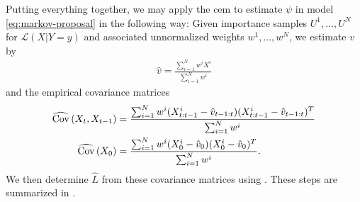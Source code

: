 Putting everything together, we may apply the \gls{cem} to estimate $\psi$ in model \eqref{eq:markov-proposal} in the following way: Given importance samples $U^{1}, \dots, U^{N}$ for $\mathcal L (X| Y = y)$ and associated unnormalized weights $w^{1}, \dots, w^{N}$, we estimate $v$ by 
\begin{align}
\label{eq:hat_v}
\hat v = \frac{\sum_{i = 1}^N w^{i}X^{i}}{\sum_{i = 1}^N w^{i}}
\end{align}
and the empirical covariance matrices
\begin{align}
    \label{eq:empirical_covs}
    \widehat{\operatorname{Cov}} \left( X_{t}, X_{t - 1} \right) &= \frac{\sum_{i = 1}^N w^{i}(X_{t:t-1}^{i} - \hat v_{t-1:t}) (X_{t:t-1}^{i} - \hat v_{t-1:t})^{T}}{\sum_{i = 1}^N w^{i}}\\
\widehat{\operatorname{Cov}} \left( X_{0}\right) &= \frac{\sum_{i = 1}^N w^{i}(X_{0}^{i} - \hat v_{0}) (X_{0}^{i} - \hat v_{0})^{T}}{\sum_{i = 1}^N w^{i}}.
\end{align}
We then determine $\hat L$ from these covariance matrices using . 
These steps are summarized in . 

